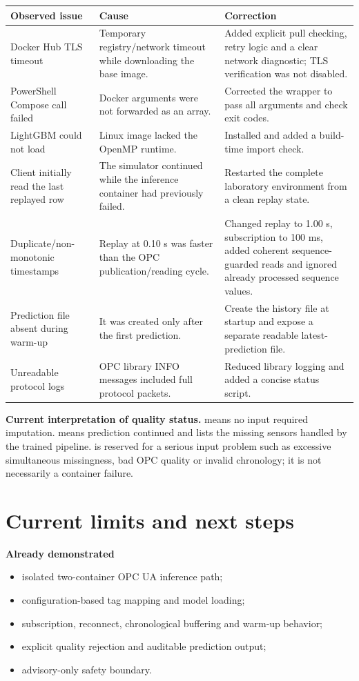 \documentclass[11pt,a4paper]{article}
\newcommand{\code}[1]{\texttt{\detokenize{#1}}}
\begin{document}
\begin{tabularx}{\textwidth}{@{}L{3.4cm}Y Y@{}}
\toprule
\textbf{Observed issue} & \textbf{Cause} & \textbf{Correction} \\
\midrule
Docker Hub TLS timeout & Temporary registry/network timeout while downloading the base image. & Added explicit pull checking, retry logic and a clear network diagnostic; TLS verification was not disabled. \\
PowerShell Compose call failed & Docker arguments were not forwarded as an array. & Corrected the wrapper to pass all arguments and check exit codes. \\
LightGBM could not load & Linux image lacked the OpenMP runtime. & Installed \code{libgomp1} and added a build-time import check. \\
Client initially read the last replayed row & The simulator continued while the inference container had previously failed. & Restarted the complete laboratory environment from a clean replay state. \\
Duplicate/non-monotonic timestamps & Replay at 0.10 s was faster than the OPC publication/reading cycle. & Changed replay to 1.00 s, subscription to 100 ms, added coherent sequence-guarded reads and ignored already processed sequence values. \\
Prediction file absent during warm-up & It was created only after the first prediction. & Create the history file at startup and expose a separate readable latest-prediction file. \\
Unreadable protocol logs & OPC library INFO messages included full protocol packets. & Reduced library logging and added a concise status script. \\
\bottomrule
\end{tabularx}

\textbf{Current interpretation of quality status.} \code{GOOD} means no input required imputation. \code{IMPUTED} means prediction continued and lists the missing sensors handled by the trained pipeline. \code{DATA_ERROR} is reserved for a serious input problem such as excessive simultaneous missingness, bad OPC quality or invalid chronology; it is not necessarily a container failure.

\section{Current limits and next steps}

\textbf{Already demonstrated}
\begin{itemize}
  \item isolated two-container OPC UA inference path;
  \item configuration-based tag mapping and model loading;
  \item subscription, reconnect, chronological buffering and warm-up behavior;
  \item explicit quality rejection and auditable prediction output;
  \item advisory-only safety boundary.
\end{itemize}
\end{document}
